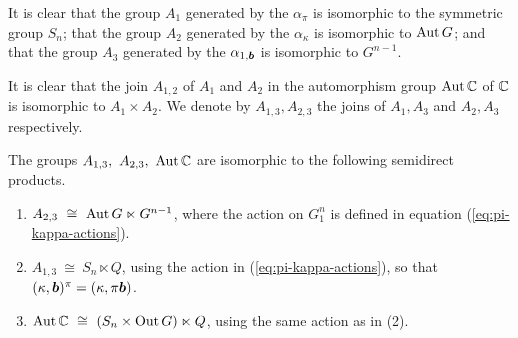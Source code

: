 It is clear that the group $A_1$ generated by the $\alpha_{\pi}$ 
is isomorphic to the symmetric group $S_n$; 
that the group $A_2$ generated by the $\alpha_{\kappa}$ 
is isomorphic to $\mathrm{Aut}\,G$; 
and that the group $A_3$ generated by the $\alpha_{1,\boldsymbol{b}}$ 
is isomorphic to $G^{n-1}$. 

It is clear that the join $A_{1,2}$ of $A_1$ and $A_2$ in the 
automorphism group $\mathrm{Aut}\,\mathbb{C}$ of $\mathbb{C}$ is isomorphic to $A_1 \times A_2$.  
We denote by $A_{1,3},A_{2,3}$ the joins of $A_1,A_3$ and $A_2,A_3$ 
respectively. 

\begin{prop}
The groups $A_{1,3},~ A_{2,3},~ \mathrm{Aut}\,\mathbb{C}$ 
are isomorphic to the following semidirect products.  
\begin{enumerate}[(1)]  
\item 
$A_{2,3} ~\cong~ \mathrm{Aut}\,G \ltimes G^{n-1}$, 
where the action on $G^n_1$ is defined in equation (\ref{eq:pi-kappa-actions}).
\item
$A_{1,3} ~\cong~ S_n \ltimes Q$,  
using the action in (\ref{eq:pi-kappa-actions}), so that  
$(\kappa,\boldsymbol{b})^{\pi} = (\kappa,\pi\boldsymbol{b})$. 
\item
$\mathrm{Aut}\,\mathbb{C} ~\cong~ (S_n \times \mathrm{Out}\,G) \ltimes Q$, 
using the same action as in (2). 
\end{enumerate} 
\end{prop}
